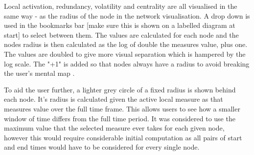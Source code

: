 Local activation, redundancy, volatility and centrality are all visualised in the same way - as the radius of the node in the network visualisation. A drop down is used in the bookmarks bar [make sure this is shown on a labelled diagram at start] to select between them. The values are calculated for each node and the nodes radius is then calculated as the log of double the measures value, plus one. The values are doubled to give more visual separation which is hampered by the log scale. The "+1" is added so that nodes always have a radius to avoid breaking the user's mental map \cite{BLANK}.

To aid the user further, a lighter grey circle of a fixed radius is shown behind each node. It's radius is calculated given the active local measure as that measures value over the full time frame. This allows users to see how a smaller window of time differs from the full time period. It was considered to use the maximum value that the selected measure ever takes for each given node, however this would require considerable initial computation as all pairs of start and end times would have to be considered for every single node.
